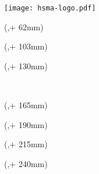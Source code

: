 \noindent\texttt{[image: hsma-logo.pdf]}\\

\begin{textblock*}{128mm}(\hsmafenster,\seitenanfang + 62mm) %
  \centering\Large\sffamily
  \vspace{4mm} %
  \textbf{\hsmatitel}
\end{textblock*}%

\begin{textblock*}{128mm}(\hsmafenster,\seitenanfang + 103mm)
  \centering\large\sffamily
  \hsmaautor
\end{textblock*}

\begin{textblock*}{\seitenbreite}(\bindekorrektur,\seitenanfang + 130mm)
  \centering\large\sffamily
  \hsmatyp\\
  \begin{small}\hsmathesistype \end{small}\\
  \vspace{2mm}
  \hsmastudiengangname
\end{textblock*}

\begin{textblock*}{\seitenbreite}(\bindekorrektur,\seitenanfang + 165mm)
  \centering\large\sffamily
  \hsmafakultaetlang\\
  \vspace{2mm}
  \hsmakoerperschaft
\end{textblock*}

\begin{textblock*}{\seitenbreite}(\bindekorrektur,\seitenanfang + 190mm)
  \centering\large
  \textsf{\hsmadatum}
\end{textblock*}

\begin{textblock*}{\seitenbreite}(\bindekorrektur,\seitenanfang + 215mm)
  \centering\large
\end{textblock*}

\begin{textblock*}{\seitenbreite}(\bindekorrektur,\seitenanfang + 240mm)
  \centering\large\sffamily
  \hsmatutor \\
  \vspace{2mm}
  \hsmabetreuer\\
  \vspace{2mm}
  \hsmazweitkorrektor
\end{textblock*}


